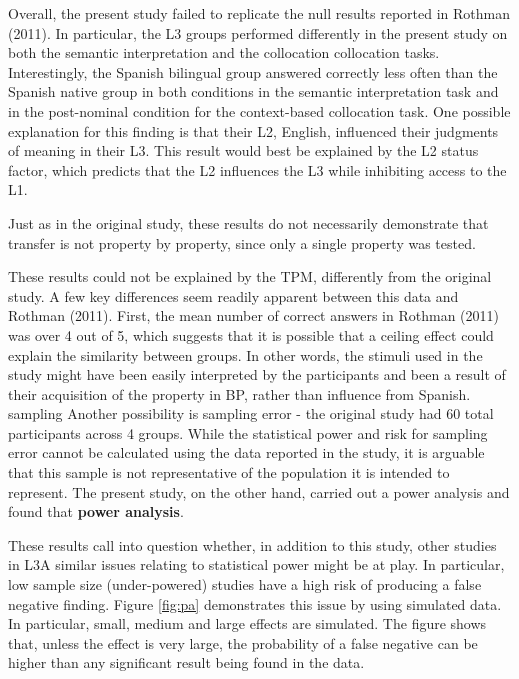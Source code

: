 \documentclass[
  man]{apa6}
\begin{document}
Overall, the present study failed to replicate the null results reported in Rothman (2011).
In particular, the L3 groups performed differently in the present study on both the semantic interpretation and the collocation collocation tasks.
Interestingly, the Spanish bilingual group answered correctly less often than the Spanish native group in both conditions in the semantic interpretation task and in the post-nominal condition for the context-based collocation task.
One possible explanation for this finding is that their L2, English, influenced their judgments of meaning in their L3.
This result would best be explained by the L2 status factor, which predicts that the L2 influences the L3 while inhibiting access to the L1.

Just as in the original study, these results do not necessarily demonstrate that transfer is not property by property, since only a single property was tested.

These results could not be explained by the TPM, differently from the original study.
A few key differences seem readily apparent between this data and Rothman (2011).
First, the mean number of correct answers in Rothman (2011) was over 4 out of 5, which suggests that it is possible that a ceiling effect could explain the similarity between groups.
In other words, the stimuli used in the study might have been easily interpreted by the participants and been a result of their acquisition of the property in BP, rather than influence from Spanish.
sampling
Another possibility is sampling error - the original study had 60 total participants across 4 groups.
While the statistical power and risk for sampling error cannot be calculated using the data reported in the study, it is arguable that this sample is not representative of the population it is intended to represent.
The present study, on the other hand, carried out a power analysis and found that \textbf{power analysis}.

These results call into question whether, in addition to this study, other studies in L3A similar issues relating to statistical power might be at play.
In particular, low sample size (under-powered) studies have a high risk of producing a false negative finding.
Figure \ref{fig:pa} demonstrates this issue by using simulated data.
In particular, small, medium and large effects are simulated.
The figure shows that, unless the effect is very large, the probability of a false negative can be higher than any significant result being found in the data.
\end{document}
